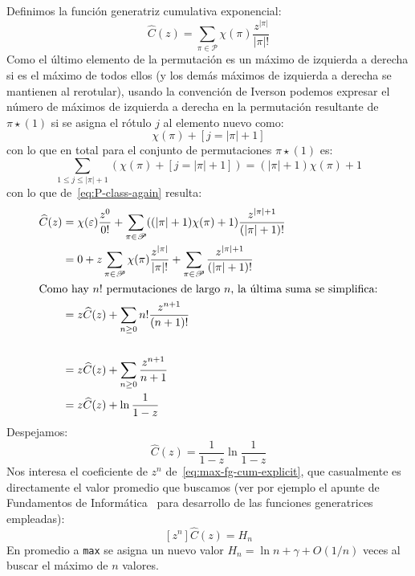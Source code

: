   Definimos la función generatriz cumulativa exponencial:
  \begin{equation}
    \label{eq:max-fg-cum}
    \widehat{C}(z)
      = \sum_{\pi \in \mathscr{P}}
          \chi(\pi) \frac{z^{\lvert \pi \rvert}}{\lvert \pi \rvert !}
  \end{equation}
  Como el último elemento de la permutación
  es un máximo de izquierda a derecha
  si es el máximo de todos ellos
  (y los demás máximos de izquierda a derecha se mantienen al rerotular),
  usando la convención de Iverson
  podemos expresar el número de máximos de izquierda a derecha
  en la permutación resultante de \(\pi \star (1)\)
  si se asigna el rótulo \(j\) al elemento nuevo como:
  \begin{equation}
    \label{eq:app:chi+1}
    \chi(\pi) + [j = \lvert \pi \rvert + 1]
  \end{equation}
  con lo que en total
  para el conjunto de permutaciones \(\pi \star (1)\) es:
  \begin{equation*}
    \sum_{1 \le j \le \lvert \pi \rvert + 1}
      (\chi(\pi) + [j = \lvert \pi \rvert + 1])
      = (\lvert \pi \rvert + 1 ) \chi(\pi)
          + 1
  \end{equation*}
  con lo que de~\eqref{eq:P-class-again} resulta:
  \begin{align*}
    \widehat{C}(z)
      &= \chi(\varepsilon) \frac{z^0}{0!}
           + \sum_{\pi \in \mathscr{P}}
               ((\lvert \pi \rvert + 1) \chi(\pi) + 1)
                 \frac{z^{\lvert \pi \rvert + 1}}{(\lvert \pi \rvert + 1)!} \\
      &= 0
           + z \sum_{\pi \in \mathscr{P}}
                 \chi(\pi) \frac{z^{\lvert \pi \rvert}}{\lvert \pi \rvert !}
           + \sum_{\pi \in \mathscr{P}}
               \frac{z^{\lvert \pi \rvert + 1}}{(\lvert \pi \rvert + 1)!} \\
  \intertext{Como hay \(n!\) permutaciones de largo \(n\),
             la última suma se simplifica:}
      &= z \widehat{C}(z)
           + \sum_{n \ge 0} n! \frac{z^{n + 1}}{(n + 1)!} \\
             \notag \\
      &= z \widehat{C}(z)
           + \sum_{n \ge 0} \frac{z^{n + 1}}{n + 1} \\
      &= z \widehat{C}(z) + \ln \frac{1}{1 - z}
  \end{align*}
  Despejamos:
  \begin{equation}
    \label{eq:max-fg-cum-explicit}
    \widehat{C}(z)
      = \frac{1}{1 - z} \ln \frac{1}{1 - z}
  \end{equation}
  Nos interesa el coeficiente de \(z^n\) de~\eqref{eq:max-fg-cum-explicit},
  que casualmente es directamente el valor promedio que buscamos
  (ver por ejemplo el apunte de Fundamentos de Informática~%
     \cite{brand17:_fundamentos_informatica}
   para desarrollo de las funciones generatrices empleadas):
  \begin{equation}
    \label{eq:1}
    [z^n] \widehat{C}(z)
      = H_n
  \end{equation}
  En promedio a \lstinline[language = C]!max! se asigna un nuevo valor
  \(H_n = \ln n + \gamma + O(1/n)\) veces
  al buscar el máximo de \(n\) valores.

